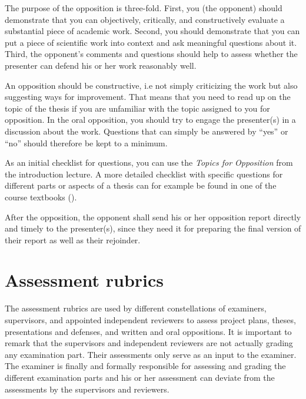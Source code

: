 \documentclass[a4paper,12pt]{book}
\begin{document}
The purpose of the opposition is three-fold. First, you (the opponent)
should demonstrate that you can objectively, critically, and constructively evaluate
a substantial piece of academic work. Second, you should demonstrate that you
can put a piece of scientific work into context and ask meaningful questions
about it.
Third, the opponent's comments and questions should help to assess whether
the presenter can defend his or her work reasonably well.

An opposition should be constructive, i.e not simply criticizing the work
but also suggesting ways for improvement. That means that you need to
read up on the topic of the thesis if you are unfamiliar with the topic
assigned to you for opposition.
In the oral opposition, you should try to engage the presenter(s) in a
discussion about the work. Questions that can simply be answered by ``yes''
or ``no'' should therefore be kept to a minimum.

As an initial checklist for questions, you can use the \textit{Topics for
Opposition} from the introduction lecture. A more detailed checklist with
specific questions for different parts or aspects of a thesis can for example
be found in one of the course textbooks (\cite[chp~12.2]{berndtsson2007thesis}).

After the opposition, the opponent shall send his or her opposition report
directly and timely to the presenter(s), since they need it for preparing the
final version of their report as well as their rejoinder.



\appendix

\chapter{Assessment rubrics}
\label{chp:rubrics}
The assessment rubrics are used by different constellations of
examiners, supervisors, and appointed independent reviewers to assess
project plans, theses, presentations and defenses, and written and
oral oppositions. It is important to remark that the supervisors and
independent reviewers are not actually grading any examination part.
Their assessments only serve as an input to the examiner. The examiner is
finally and formally responsible for assessing and grading the different
examination parts and his or her assessment can deviate from the assessments
by the supervisors and reviewers.
\end{document}
